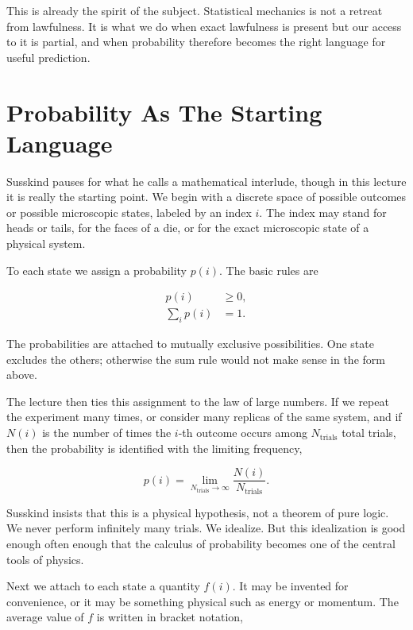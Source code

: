 This is already the spirit of the subject. Statistical mechanics is not a retreat from lawfulness. It is what we do when exact lawfulness is present but our access to it is partial, and when probability therefore becomes the right language for useful prediction.

\section{Probability As The Starting Language}

Susskind pauses for what he calls a mathematical interlude, though in this lecture it is really the starting point. We begin with a discrete space of possible outcomes or possible microscopic states, labeled by an index \(i\). The index may stand for heads or tails, for the faces of a die, or for the exact microscopic state of a physical system.

To each state we assign a probability \(p(i)\). The basic rules are

\begin{align}
p(i) &\ge 0, \\
\sum_i p(i) &= 1.
\end{align}

The probabilities are attached to mutually exclusive possibilities. One state excludes the others; otherwise the sum rule would not make sense in the form above.

The lecture then ties this assignment to the law of large numbers. If we repeat the experiment many times, or consider many replicas of the same system, and if \(N(i)\) is the number of times the \(i\)-th outcome occurs among \(N_{\text{trials}}\) total trials, then the probability is identified with the limiting frequency,

\begin{equation}
p(i)=\lim_{N_{\text{trials}}\to\infty}\frac{N(i)}{N_{\text{trials}}}.
\end{equation}

Susskind insists that this is a physical hypothesis, not a theorem of pure logic. We never perform infinitely many trials. We idealize. But this idealization is good enough often enough that the calculus of probability becomes one of the central tools of physics.

Next we attach to each state a quantity \(f(i)\). It may be invented for convenience, or it may be something physical such as energy or momentum. The average value of \(f\) is written in bracket notation,

